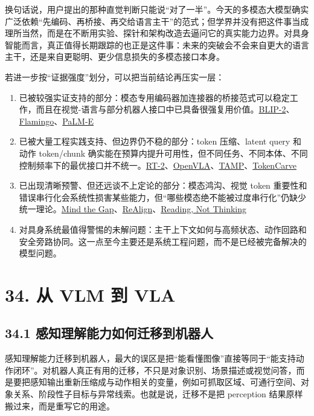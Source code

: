 换句话说，用户提出的那种直觉判断只能说“对了一半”。今天的多模态大模型确实广泛依赖“先编码、再桥接、再交给语言主干”的范式；但学界并没有把这件事当成理所当然，而是在不断用实验、探针和架构改造去逼问它的真实能力边界。对具身智能而言，真正值得长期跟踪的也正是这件事：未来的突破会不会来自更大的语言主干，还是来自更聪明、更少信息损失的多模态接口本身。

若进一步按“证据强度”划分，可以把当前结论再压实一层：

\begin{enumerate}
\item 已被较强实证支持的部分：模态专用编码器加连接器的桥接范式可以稳定工作，而且在视觉-语言与部分机器人接口中已具备很强复用价值。\href{https://arxiv.org/abs/2301.12597}{BLIP-2}、\href{https://arxiv.org/abs/2204.14198}{Flamingo}、\href{https://arxiv.org/abs/2303.03378}{PaLM-E}
\item 已被大量工程实践支持、但边界仍不稳的部分：token 压缩、latent query 和动作 token/chunk 确实能在预算内提升可用性，但不同任务、不同本体、不同控制频率下的最优接口并不统一。\href{https://arxiv.org/abs/2307.15818}{RT-2}、\href{https://arxiv.org/abs/2406.09246}{OpenVLA}、\href{https://arxiv.org/abs/2504.09897}{TAMP}、\href{https://arxiv.org/abs/2503.10501}{TokenCarve}
\item 已出现清晰预警、但还远谈不上定论的部分：模态鸿沟、视觉 token 重要性和错误串行化会系统性损害某些能力，但“哪些模态绝不能被过度串行化”仍缺少统一理论。\href{https://arxiv.org/abs/2203.02053}{Mind the Gap}、\href{https://arxiv.org/abs/2602.07026}{ReAlign}、\href{https://arxiv.org/abs/2603.09095}{Reading, Not Thinking}
\item 对具身系统最值得警惕的未解问题：主干上下文如何与高频状态、动作回路和安全旁路协同。这一点至今主要还是系统工程问题，而不是已经被完备解决的模型问题。
\end{enumerate}

\section*{34. 从 VLM 到 VLA}

\subsection*{34.1 感知理解能力如何迁移到机器人}


感知理解能力迁移到机器人，最大的误区是把“能看懂图像”直接等同于“能支持动作闭环”。对机器人真正有用的迁移，不只是对象识别、场景描述或视觉问答，而是要把感知输出重新压缩成与动作相关的变量，例如可抓取区域、可通行空间、对象关系、阶段性子目标与异常线索。也就是说，迁移不是把 perception 结果原样搬过来，而是重写它的用途。

